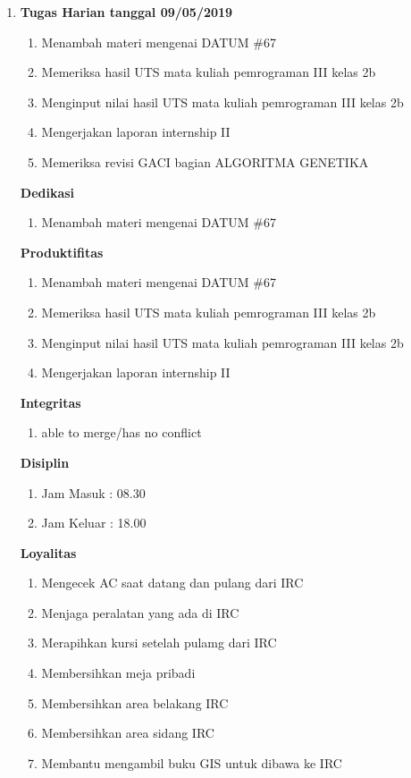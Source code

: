\begin{enumerate}
\item \textbf{Tugas Harian tanggal 09/05/2019}
\begin{enumerate}
\item Menambah materi mengenai DATUM \#67
\item Memeriksa hasil UTS mata kuliah pemrograman III kelas 2b
\item Menginput nilai hasil UTS mata kuliah pemrograman III kelas 2b
\item Mengerjakan laporan internship II
\item Memeriksa revisi GACI bagian ALGORITMA GENETIKA
\end{enumerate}

\textbf{Dedikasi}
\begin{enumerate}
\item Menambah materi mengenai DATUM \#67
\end{enumerate}

\textbf{Produktifitas}
\begin{enumerate}
\item Menambah materi mengenai DATUM \#67
\item Memeriksa hasil UTS mata kuliah pemrograman III kelas 2b
\item Menginput nilai hasil UTS mata kuliah pemrograman III kelas 2b
\item Mengerjakan laporan internship II
\end{enumerate}

\textbf{Integritas}
\begin{enumerate}
\item able to merge/has no conflict
\end{enumerate}

\textbf{Disiplin}
\begin{enumerate}
\item Jam Masuk : 08.30
\item Jam Keluar : 18.00
\end{enumerate}

\textbf{Loyalitas}
\begin{enumerate}
\item Mengecek AC saat datang dan pulang dari IRC
\item Menjaga peralatan yang ada di IRC
\item Merapihkan kursi setelah pulamg dari IRC
\item Membersihkan meja pribadi
\item Membersihkan area belakang IRC
\item Membersihkan area sidang IRC
\item Membantu mengambil buku GIS untuk dibawa ke IRC
\end{enumerate}



\end{enumerate}
